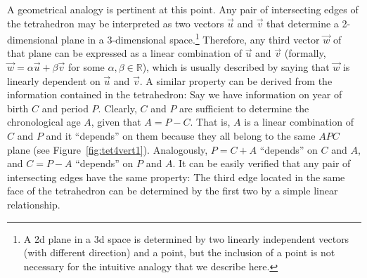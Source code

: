 \documentclass[11pt,oneside,a4paper]{article} %
\newcommand\vt[1]{\textcolor{rd}{#1}}
\begin{document}

A geometrical analogy is pertinent at this point. Any pair of intersecting edges
of the tetrahedron may be interpreted as two vectors $\vec{u}$ and $\vec{v}$
that determine a 2-dimensional plane in a 3-dimensional
space.\footnote{A 2d plane in a 3d space is determined by two linearly independent
vectors (with different direction) and a point, but the inclusion of a point is not
necessary for the intuitive analogy that we describe here.} Therefore, any third
vector $\vec{w}$ of that plane can be expressed as a linear combination of
$\vec{u}$ and $\vec{v}$ (formally, $\vec{w}=\alpha\vec{u}+\beta\vec{v}$ for some $\alpha, \beta \in \mathbb{R}$), which is usually
described by saying that $\vec{w}$ is linearly dependent on $\vec{u}$ and
$\vec{v}$.
A similar property can be derived from the information contained in the
tetrahedron: Say we have information on year of birth $C$ and period $P$. Clearly, $C$ and $P$ are sufficient to determine the chronological age $A$, given that  $A=P-C$. That is, $A$ is a linear combination of $C$ and $P$ and it ``depends'' on them because they all belong to the same $APC$ plane (see Figure~\ref{fig:tet4vert1}). Analogously, $P=C+A$ ``depends'' on $C$ and $A$, and $C=P-A$ ``depends'' on $P$ and $A$. It can be easily verified that any pair of intersecting edges have the same property: The third edge located in the same face of the tetrahedron can be determined by the first two by a simple linear relationship.
\end{document}
